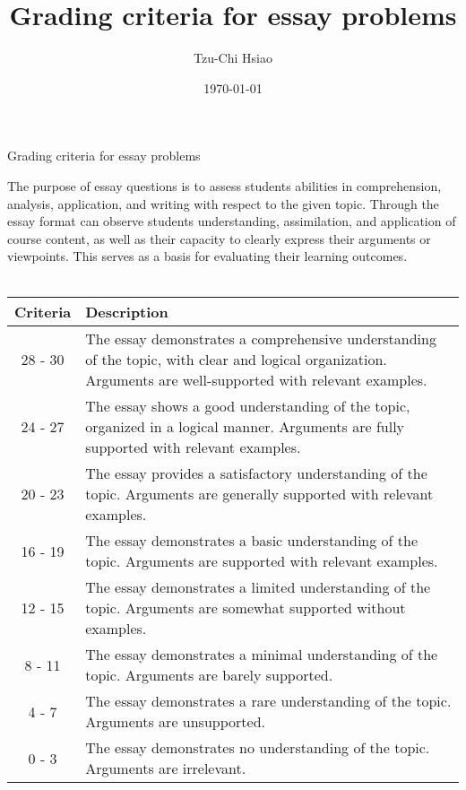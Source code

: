 \documentclass[12pt]{article}
\title{Grading criteria for essay problems}
\author{Tzu-Chi Hsiao}
\date{\today}
\begin{document}
\thispagestyle{fancy}
\begin{center}
\fontsize{16pt}{16pt}\selectfont Grading criteria for essay problems
\end{center}
\fontsize{14pt}{14pt}\selectfont
The purpose of essay questions is to assess students abilities in comprehension, analysis, application, and writing with respect to the given topic. Through the essay format can observe students understanding, assimilation, and application of course content, as well as their capacity to clearly express their arguments or viewpoints. This serves as a basis for evaluating their learning outcomes. \\
\\ \vspace{0.5em}
\begin{tabular}{|c|p{14cm}|}
\hline
Criteria & Description \\
\hline
28 - 30 & The essay demonstrates a comprehensive understanding of the topic, with clear and logical organization. Arguments are well-supported with relevant examples. \\
\hline
24 - 27 & The essay shows a good understanding of the topic, organized in a logical manner. Arguments are fully supported with relevant examples. \\
\hline
20 - 23 & The essay provides a satisfactory understanding of the topic. Arguments are generally supported with relevant examples. \\
\hline
16 - 19 & The essay demonstrates a basic understanding of the topic. Arguments are supported with relevant examples. \\
\hline
12 - 15 & The essay demonstrates a limited understanding of the topic. Arguments are somewhat supported without examples. \\
\hline
8 - 11 & The essay demonstrates a minimal understanding of the topic. Arguments are barely supported. \\
\hline
4 - 7 & The essay demonstrates a rare understanding of the topic. Arguments are unsupported. \\
\hline
0 - 3 & The essay demonstrates no understanding of the topic. Arguments are irrelevant. \\
\hline
\end{tabular}
\end{document}
